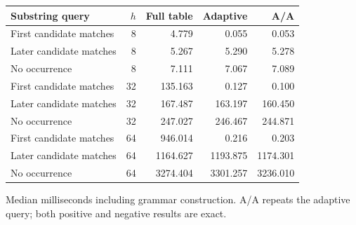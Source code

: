 \begin{center}\small
\begin{tabular}{@{}lrrrr@{}}
\toprule
Substring query & $h$ & Full table & Adaptive & A/A \\
\midrule
First candidate matches & 8 & 4.779 & 0.055 & 0.053 \\
Later candidate matches & 8 & 5.267 & 5.290 & 5.278 \\
No occurrence & 8 & 7.111 & 7.067 & 7.089 \\
First candidate matches & 32 & 135.163 & 0.127 & 0.100 \\
Later candidate matches & 32 & 167.487 & 163.197 & 160.450 \\
No occurrence & 32 & 247.027 & 246.467 & 244.871 \\
First candidate matches & 64 & 946.014 & 0.216 & 0.203 \\
Later candidate matches & 64 & 1164.627 & 1193.875 & 1174.301 \\
No occurrence & 64 & 3274.404 & 3301.257 & 3236.010 \\
\bottomrule
\end{tabular}
\end{center}
Median milliseconds including grammar construction. A/A repeats the adaptive query; both positive and negative results are exact.

